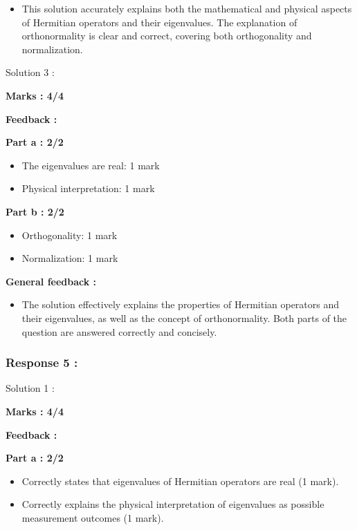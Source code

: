 \documentclass[a4paper,11pt]{article}
\begin{document}
\begin{itemize}
    \item This solution accurately explains both the mathematical and physical aspects of Hermitian operators and their eigenvalues. The explanation of orthonormality is clear and correct, covering both orthogonality and normalization.
\end{itemize}


Solution 3 : 

\textbf{Marks : 4/4}

\textbf{Feedback : }

\textbf{Part a : 2/2}

\begin{itemize}
    \item The eigenvalues are real: 1 mark
    \item Physical interpretation: 1 mark
\end{itemize}


\textbf{Part b : 2/2}

\begin{itemize}
    \item Orthogonality: 1 mark
    \item Normalization: 1 mark
\end{itemize}


\textbf{General feedback :}

\begin{itemize}
    \item The solution effectively explains the properties of Hermitian operators and their eigenvalues, as well as the concept of orthonormality. Both parts of the question are answered correctly and concisely.
\end{itemize}



\subsubsection*{Response 5 :}

Solution 1 : 

\textbf{Marks : 4/4}

\textbf{Feedback : }

\textbf{Part a : 2/2}

\begin{itemize}
    \item Correctly states that eigenvalues of Hermitian operators are real (1 mark).
    \item Correctly explains the physical interpretation of eigenvalues as possible measurement outcomes (1 mark).
\end{itemize}
\end{document}
